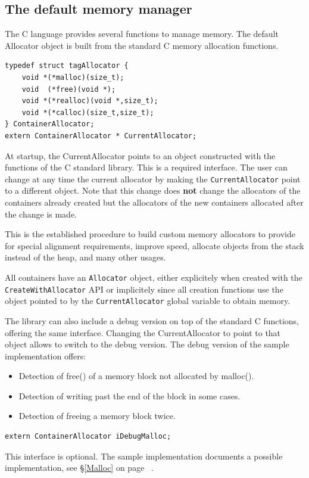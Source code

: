 \documentclass[12pt,a4paper]{memoir} %
\newcommand{\See}[1]{%
see \S\ref{#1} on page~\pageref{#1}
}
\begin{document}
\subsection{The default memory manager}
The C language provides several functions to manage memory. The default Allocator object is built from the standard C memory allocation functions.
\begin{verbatim}
typedef struct tagAllocator {
    void *(*malloc)(size_t);
    void  (*free)(void *);
    void *(*realloc)(void *,size_t);
    void *(*calloc)(size_t,size_t);
} ContainerAllocator;
extern ContainerAllocator * CurrentAllocator;
\end{verbatim}
At startup, the CurrentAllocator points to an object constructed with the functions of the C standard library. This is a required interface.
The user can change at any time the current allocator by making the \verb,CurrentAllocator, point to a different object. Note that this change
does \textbf{not} change the allocators of the containers already created but the allocators of the new containers allocated after the
change is made.

This is the established procedure to build custom memory allocators to provide for special alignment requirements, improve speed, allocate objects
from the stack instead of the heap, and many other usages.

All containers have an \verb,Allocator, object, either explicitely when created with the \verb,CreateWithAllocator, API or implicitely since all 
creation functions use the object pointed to by the \verb,CurrentAllocator, global variable to obtain memory.

The library can also include a debug version on top of the standard C functions, offering the same interface. Changing the CurrentAllocator to point to that object allows to switch to the debug version. The debug version of the sample implementation offers:
\begin{itemize}
\item
Detection of free() of a memory block not allocated by malloc().
\item
Detection of  writing past the end of the block in some cases.
\item
Detection of freeing a memory block twice.
\end{itemize}
\begin{verbatim}
extern ContainerAllocator iDebugMalloc;
\end{verbatim}
This interface is optional. The sample implementation documents a possible implementation, \See{Malloc}.
\end{document}
